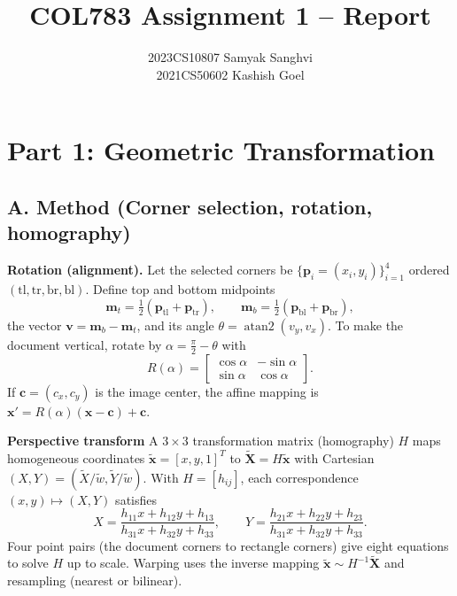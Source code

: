 \documentclass[10pt,a4paper]{article}
\title{COL783 Assignment 1 – Report}
\author{2023CS10807 Samyak Sanghvi \\ 2021CS50602 Kashish Goel\vspace{-0.8em}}
\date{\vspace{-1.5em}}
\begin{document}
\maketitle


\section{Part 1: Geometric Transformation}
\subsection{A. Method (Corner selection, rotation, homography)}
\textbf{Rotation (alignment).} Let the selected corners be $\{\mathbf{p}_i=(x_i,y_i)\}_{i=1}^4$ ordered $(\text{tl},\text{tr},\text{br},\text{bl})$. Define top and bottom midpoints
\[ \mathbf{m}_t=\tfrac{1}{2}(\mathbf{p}_{\text{tl}}+\mathbf{p}_{\text{tr}}),\qquad \mathbf{m}_b=\tfrac{1}{2}(\mathbf{p}_{\text{bl}}+\mathbf{p}_{\text{br}}), \]
the vector $\mathbf{v}=\mathbf{m}_b-\mathbf{m}_t$, and its angle $\theta=\operatorname{atan2}(v_y, v_x)$. To make the document vertical, rotate by $\alpha=\tfrac{\pi}{2}-\theta$ with
\[ R(\alpha)=\begin{bmatrix}\cos\alpha & -\sin\alpha\\ \sin\alpha & \cos\alpha\end{bmatrix}. \]
If $\mathbf{c}=(c_x,c_y)$ is the image center, the affine mapping is $\mathbf{x}' = R(\alpha)(\mathbf{x}-\mathbf{c})+\mathbf{c}$.

	\textbf{Perspective transform} A $3\times3$ transformation matrix (homography) $H$ maps homogeneous coordinates $\tilde{\mathbf{x}}=[x,y,1]^T$ to $\tilde{\mathbf{X}}=H\tilde{\mathbf{x}}$ with Cartesian $(X,Y)=(\tilde X/\tilde w,\tilde Y/\tilde w)$. With $H=[h_{ij}]$, each correspondence $(x,y)\mapsto(X,Y)$ satisfies
\[
 X = \frac{h_{11}x + h_{12}y + h_{13}}{h_{31}x + h_{32}y + h_{33}},\qquad
 Y = \frac{h_{21}x + h_{22}y + h_{23}}{h_{31}x + h_{32}y + h_{33}}.
\]
Four point pairs (the document corners to rectangle corners) give eight equations to solve $H$ up to scale. Warping uses the inverse mapping $\tilde{\mathbf{x}} \sim H^{-1}\tilde{\mathbf{X}}$ and resampling (nearest or bilinear).
\end{document}
